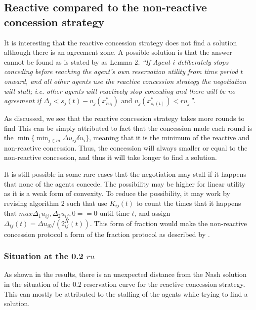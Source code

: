 \subsection{Reactive compared to the non-reactive concession strategy}
It is interesting that the reactive concession strategy does not find a solution although there is an agreement zone. 
A possible solution is that the answer cannot be found as is stated by \citet{zheng2015automated} as Lemma 2. \textit{``If Agent $i$ deliberately stops conceding before reaching the agent's own reservation utility from time period $t$ onward, and all other agents use the reactive concession strategy the negotiation will stall; i.e. other agents will reactively stop conceding and there will be no agreement if $\Delta_j < s_j(t)-u_j(x^*_{ru_i}) \text{ and } u_j(x^*_{s_i(t)})<ru_j$''}.

As discussed, we see that the reactive concession strategy takes more rounds to find  This can be simply attributed to fact that the concession made each round is the $\displaystyle \min\{ \min_{j \in m}\Delta u_{ij} \delta u_i\}$, meaning that it is the minimum of the reactive and non-reactive concession. Thus, the concession will always smaller or equal to the non-reactive concession, and thus it will take longer to find a solution.

It is still possible in some rare cases that the negotiation may stall if it happens that none of the agents concede. The possibility may be higher for linear utility as it is a weak form of convexity. To reduce the possibility, it may work by revising algorithm 2 such that use $K_{ij}(t)$ to count the times that it happens that $max{ \Delta_1 u_{ij},\Delta_2 u_{ij}, 0 } == 0$ until time $t$, and assign $\Delta_{ij}(t) =  \Delta u_{i0}/(2^K_{ij}(t))$. This form of fraction would make the non-reactive concession protocol a form of the fraction protocol as described by \citet{wu2009efficient}.


\subsubsection{Situation at the 0.2 $ru$}
As shown in the results, there is an unexpected distance from the Nash solution in the situation of the 0.2 reservation curve for the reactive concession strategy. This can mostly be attributed to the stalling of the agents while trying to find a solution.

